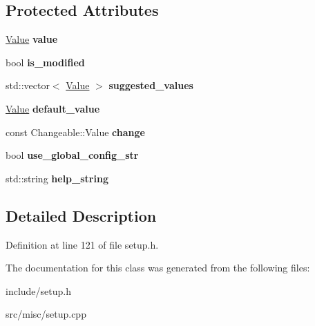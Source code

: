 \subsection*{Protected Attributes}
\begin{DoxyCompactItemize}
\item 
\hypertarget{classProperty_ab9f796553f3beee1cc6a4c4a9d352f28}{\hyperlink{classValue}{Value} {\bfseries value}}\label{classProperty_ab9f796553f3beee1cc6a4c4a9d352f28}

\item 
\hypertarget{classProperty_a478478c72fd7da282d03c652f567bc68}{bool {\bfseries is\-\_\-modified}}\label{classProperty_a478478c72fd7da282d03c652f567bc68}

\item 
\hypertarget{classProperty_a358f5bbc412ec7db0f8ae400eb419d9a}{std\-::vector$<$ \hyperlink{classValue}{Value} $>$ {\bfseries suggested\-\_\-values}}\label{classProperty_a358f5bbc412ec7db0f8ae400eb419d9a}

\item 
\hypertarget{classProperty_adafc47b2053f75c1bb1811bcf7ffdd1a}{\hyperlink{classValue}{Value} {\bfseries default\-\_\-value}}\label{classProperty_adafc47b2053f75c1bb1811bcf7ffdd1a}

\item 
\hypertarget{classProperty_a8a01484c2e7a8cfcf98f01ed3a0fa293}{const Changeable\-::\-Value {\bfseries change}}\label{classProperty_a8a01484c2e7a8cfcf98f01ed3a0fa293}

\item 
\hypertarget{classProperty_abd3b538752e5d6d649dc323ce46591be}{bool {\bfseries use\-\_\-global\-\_\-config\-\_\-str}}\label{classProperty_abd3b538752e5d6d649dc323ce46591be}

\item 
\hypertarget{classProperty_a9a0f13a48b56868da27ec1e33fd0414c}{std\-::string {\bfseries help\-\_\-string}}\label{classProperty_a9a0f13a48b56868da27ec1e33fd0414c}

\end{DoxyCompactItemize}


\subsection{Detailed Description}


Definition at line 121 of file setup.\-h.



The documentation for this class was generated from the following files\-:\begin{DoxyCompactItemize}
\item 
include/setup.\-h\item 
src/misc/setup.\-cpp\end{DoxyCompactItemize}
